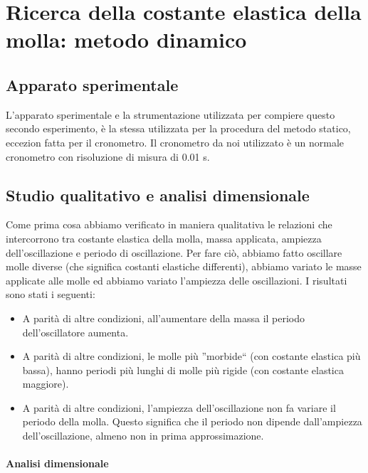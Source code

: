 \section{Ricerca della costante elastica della molla: metodo dinamico}

\subsection{Apparato sperimentale}

L'apparato sperimentale e la strumentazione utilizzata per compiere questo secondo esperimento, è la stessa utilizzata per la procedura del metodo statico, eccezion fatta per il cronometro. Il cronometro da noi utilizzato è un normale cronometro con risoluzione di misura di 0.01 s.

\subsection{Studio qualitativo e analisi dimensionale}

Come prima cosa abbiamo verificato in maniera qualitativa le relazioni che intercorrono tra
costante elastica della molla, massa applicata, ampiezza dell'oscillazione e periodo di oscillazione.
Per fare ciò, abbiamo fatto oscillare molle diverse (che significa costanti elastiche differenti), abbiamo variato
le masse applicate alle molle ed abbiamo variato l'ampiezza delle oscillazioni. I risultati sono stati
i seguenti:

\begin{itemize}
    \item{A parità di altre condizioni, all'aumentare della massa il periodo dell'oscillatore aumenta.}
    \item{A parità di altre condizioni, le molle più ''morbide`` (con costante elastica più bassa), hanno periodi più lunghi
        di molle più rigide (con costante elastica maggiore).}
    \item{A parità di altre condizioni, l'ampiezza dell'oscillazione non fa variare il periodo della molla. Questo significa
        che il periodo non dipende dall'ampiezza dell'oscillazione, almeno non in prima approssimazione.}
\end{itemize}

\paragraph{Analisi dimensionale\\}

